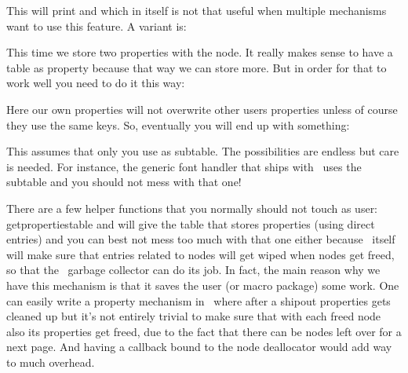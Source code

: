 This will print  and  which in itself is not that useful
when multiple mechanisms want to use this feature. A variant is:

\starttyping
{}
\stoptyping

This time we store two properties with the node. It really makes sense to have a
table as property because that way we can store more. But in order for that to
work well you need to do it this way:

\starttyping
{}
\stoptyping

Here our own properties will not overwrite other users properties unless of
course they use the same keys. So, eventually you will end up with something:

\starttyping
{}
\stoptyping

This assumes that only you use  as subtable. The possibilities are
endless but care is needed. For instance, the generic font handler that ships
with \CONTEXT\ uses the  subtable and you should not mess with
that one!

There are a few helper functions that you normally should not touch as user: \typ
{getpropertiestable} and will give the table that stores properties (using
direct entries) and you can best not mess too much with that one either because
\LUAMETATEX\ itself will make sure that entries related to nodes will get wiped when
nodes get freed, so that the \LUA\ garbage collector can do its job. In fact, the
main reason why we have this mechanism is that it saves the user (or macro
package) some work. One can easily write a property mechanism in \LUA\ where
after a shipout properties gets cleaned up but it's not entirely trivial to make
sure that with each freed node also its properties get freed, due to the fact
that there can be nodes left over for a next page. And having a callback bound to
the node deallocator would add way to much overhead.

